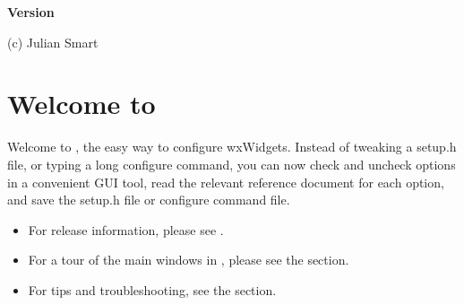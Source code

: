 %
\twocolwidtha{4cm}%
%
%
%
%
%
%
%
%
%
\newcommand{\commandref}[2]{\helpref{{\tt $\backslash$#1}}{#2}}%
\newcommand{\commandrefn}[2]{\helprefn{{\tt $\backslash$#1}}{#2}\index{#1}}%
\newcommand{\commandpageref}[2]{\latexignore{\helprefn{{\tt $\backslash$#1}}{#2}}\latexonly{{\tt $\backslash$#1} {\it page \pageref{#2}}}\index{#1}}%
\newcommand{\indexit}[1]{#1\index{#1}}%
\newcommand{\inioption}[1]{{\tt #1}\index{#1}}%
\parskip=10pt%
\parindent=0pt%
\title{\cttitle}%
\author{(c) Julian Smart, 2003}%
\makeindex%
%
\begin{center}

{\large {\bf Version \ctversion}}

(c) Julian Smart
\end{center}

\pagestyle{fancyplain}%
%
%
%
\setfooter{\thepage}{}{}{}{}{\thepage}%
\tableofcontents%


\chapter{Welcome to \ctshortname}%
%
\setfooter{\thepage}{}{}{}{}{\thepage}%

Welcome to \ctname, the easy way to configure wxWidgets.
Instead of tweaking a setup.h file, or typing a long configure
command, you can now check and uncheck options in a convenient
GUI tool, read the relevant reference document for each
option, and save the setup.h file or configure command file.

\begin{itemize}\itemsep=0pt
\item For release information, please see .
\item For a tour of the main windows in \ctshortname, please see the  section.
\item For tips and troubleshooting, see the  section.
\end{itemize}


